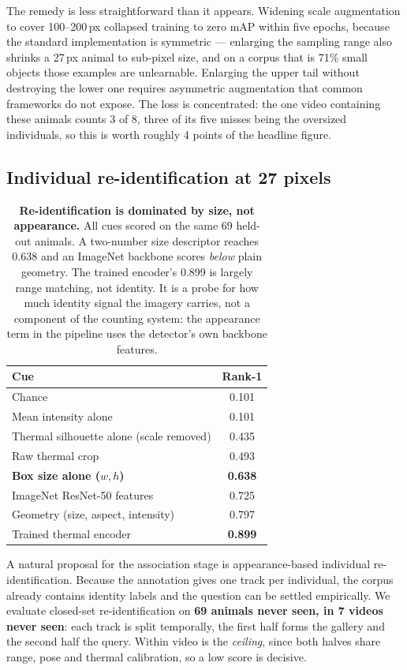 The remedy is less straightforward than it appears. Widening scale augmentation to cover
100--200\,px collapsed training to zero mAP within five epochs, because the standard
implementation is symmetric --- enlarging the sampling range also shrinks a 27\,px animal to
sub-pixel size, and on a corpus that is 71\% small objects those examples are unlearnable.
Enlarging the upper tail without destroying the lower one requires asymmetric augmentation
that common frameworks do not expose. The loss is concentrated: the one video containing
these animals counts 3 of 8, three of its five misses being the oversized individuals, so
this is worth roughly 4 points of the headline figure.

\subsection{Individual re-identification at 27 pixels}
\label{sec:reid}

\begin{table}[t]
\centering\small
\begin{tabular}{lc}
\toprule
Cue & Rank-1 \\
\midrule
Chance & 0.101 \\
Mean intensity alone & 0.101 \\
Thermal silhouette alone (scale removed) & 0.435 \\
Raw thermal crop & 0.493 \\
\textbf{Box size alone ($w,h$)} & \textbf{0.638} \\
ImageNet ResNet-50 features & 0.725 \\
Geometry (size, aspect, intensity) & 0.797 \\
Trained thermal encoder & \textbf{0.899} \\
\bottomrule
\end{tabular}
\caption{\textbf{Re-identification is dominated by size, not appearance.} All cues scored on
the same 69 held-out animals. A two-number size descriptor reaches 0.638 and an ImageNet
backbone scores \emph{below} plain geometry. The trained encoder's 0.899 is largely range
matching, not identity. It is a probe for how much identity signal the imagery carries, not
a component of the counting system: the appearance term in the pipeline uses the detector's
own backbone features.}
\label{tab:reid}
\end{table}

A natural proposal for the association stage is appearance-based individual
re-identification. Because the annotation gives one track per individual, the corpus already
contains identity labels and the question can be settled empirically. We evaluate closed-set
re-identification on \textbf{69 animals never seen, in 7 videos never seen}: each track is
split temporally, the first half forms the gallery and the second half the query. Within
video is the \emph{ceiling}, since both halves share range, pose and thermal calibration, so
a low score is decisive.

